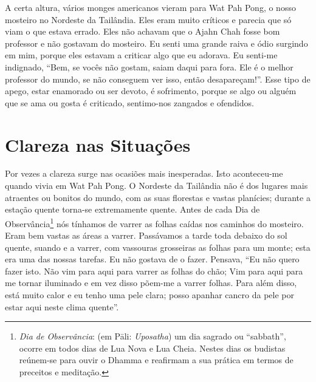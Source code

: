 A certa altura, vários monges americanos vieram para Wat Pah Pong, o nosso
mosteiro no Nordeste da Tailândia. Eles eram muito críticos e parecia que só
viam o que estava errado. Eles não achavam que o Ajahn Chah fosse bom professor
e não gostavam do mosteiro. Eu senti uma grande raiva e ódio surgindo em mim,
porque eles estavam a criticar algo que eu adorava. Eu senti-me indignado, “Bem,
se vocês não gostam, saiam daqui para fora. Ele é o melhor professor do mundo,
se não conseguem ver isso, então desapareçam!”. Esse tipo de apego, estar
enamorado ou ser devoto, é sofrimento, porque se algo ou alguém que se ama ou
gosta é criticado, sentimo-nos zangados e ofendidos.

\section{Clareza nas Situações}

Por vezes a clareza surge nas ocasiões mais inesperadas. Isto aconteceu-me
quando vivia em Wat Pah Pong. O Nordeste da Tailândia não é dos lugares mais
atraentes ou bonitos do mundo, com as suas florestas e vastas planícies; durante
a estação quente torna-se extremamente quente. Antes de cada Dia de
Observância\footnote{%
  \emph{Dia de Observância}: (em Pāli: \emph{Uposatha}) um dia sagrado ou
  “sabbath”, ocorre em todos dias de Lua Nova e Lua Cheia. Nestes dias os
  budistas reúnem-se para ouvir o Dhamma e reafirmam a sua prática em termos de
  preceitos e meditação.} nós tínhamos de varrer as folhas caídas nos caminhos
do mosteiro. Eram bem vastas as áreas a varrer. Passávamos a tarde toda debaixo
do sol quente, suando e a varrer, com vassouras grosseiras as folhas para um
monte; esta era uma das nossas tarefas. Eu não gostava de o fazer. Pensava, “Eu
não quero fazer isto. Não vim para aqui para varrer as folhas do chão; Vim para
aqui para me tornar iluminado e em vez disso põem-me a varrer folhas. Para além
disso, está muito calor e eu tenho uma pele clara; posso apanhar cancro da pele
por estar aqui neste clima quente”.

